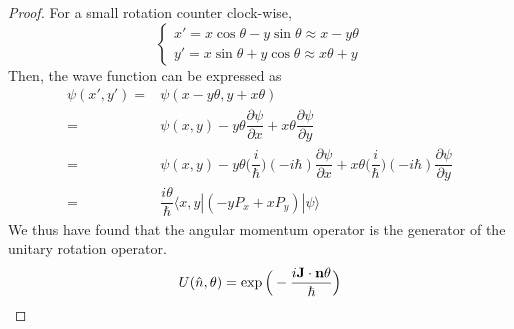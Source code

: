 \vspace{2ex}
\begin{proof}
For a small rotation counter clock-wise,
\[\begin{cases}
x'=x\cos\theta  -y\sin \theta \approx x-y\theta  \\
y'=x\sin \theta +y\cos \theta \approx x\theta +y
\end{cases}\]
Then, the wave function can be expressed as
\begin{align*}
\psi (x',y')=&\psi (x-y\theta ,y+x\theta )\\
=&\psi (x,y)-y\theta \dfrac{\partial \psi }{\partial x}+x\theta \dfrac{\partial \psi }{\partial y}\\
=&\psi (x,y)-y\theta \Big(\dfrac{i}{\hbar }\Big)(-i\hbar )\dfrac{\partial \psi }{\partial x}+x\theta \Big(\dfrac{i}{\hbar }\Big)(-i\hbar )\dfrac{\partial \psi }{\partial y}\\
=&\dfrac{i\theta }{\hbar }\langle x,y|(-yP_{x}+xP_{y})|\psi \rangle 
\end{align*}
We thus have found that the angular momentum operator is the generator of the unitary rotation operator.
\[U(\hat{n},\theta )=\exp \Big(-\dfrac{i{\bf J}\cdot {\bf n}\theta }{\hbar }\Big)\]

\end{proof}
\vspace{2ex}

